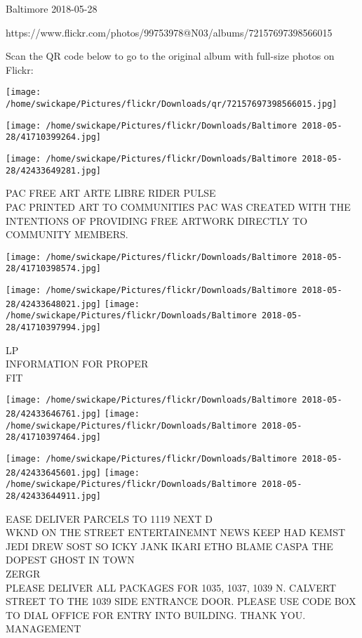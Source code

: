 \documentclass[10pt,letterpaper]{article}
\begin{document}
Baltimore 2018-05-28

https://www.flickr.com/photos/99753978@N03/albums/72157697398566015

Scan the QR code below to go to the original album with full-size photos on Flickr:

\texttt{[image: /home/swickape/Pictures/flickr/Downloads/qr/72157697398566015.jpg]}
\pagebreak

\texttt{[image: /home/swickape/Pictures/flickr/Downloads/Baltimore 2018-05-28/41710399264.jpg]}

\vspace{0.25in}
\texttt{[image: /home/swickape/Pictures/flickr/Downloads/Baltimore 2018-05-28/42433649281.jpg]}

PAC FREE ART ARTE LIBRE RIDER PULSE\\
PAC PRINTED ART TO COMMUNITIES PAC WAS CREATED WITH THE INTENTIONS OF PROVIDING FREE ARTWORK DIRECTLY TO COMMUNITY MEMBERS.
\pagebreak

\texttt{[image: /home/swickape/Pictures/flickr/Downloads/Baltimore 2018-05-28/41710398574.jpg]}

\vspace{0.25in}
\texttt{[image: /home/swickape/Pictures/flickr/Downloads/Baltimore 2018-05-28/42433648021.jpg]}
\texttt{[image: /home/swickape/Pictures/flickr/Downloads/Baltimore 2018-05-28/41710397994.jpg]}

LP\\
INFORMATION FOR PROPER\\
FIT
\pagebreak

\texttt{[image: /home/swickape/Pictures/flickr/Downloads/Baltimore 2018-05-28/42433646761.jpg]}
\texttt{[image: /home/swickape/Pictures/flickr/Downloads/Baltimore 2018-05-28/41710397464.jpg]}

\texttt{[image: /home/swickape/Pictures/flickr/Downloads/Baltimore 2018-05-28/42433645601.jpg]}
\texttt{[image: /home/swickape/Pictures/flickr/Downloads/Baltimore 2018-05-28/42433644911.jpg]}

EASE DELIVER PARCELS TO 1119 NEXT D\\
WKND ON THE STREET ENTERTAINEMNT NEWS KEEP HAD KEMST JEDI DREW SOST SO ICKY JANK IKARI ETHO BLAME CASPA THE DOPEST GHOST IN TOWN\\
ZERGR\\
PLEASE DELIVER ALL PACKAGES FOR 1035, 1037, 1039 N. CALVERT STREET TO THE 1039 SIDE ENTRANCE DOOR.  PLEASE USE CODE BOX TO DIAL OFFICE FOR ENTRY INTO BUILDING.  THANK YOU.  MANAGEMENT
\pagebreak
\end{document}
